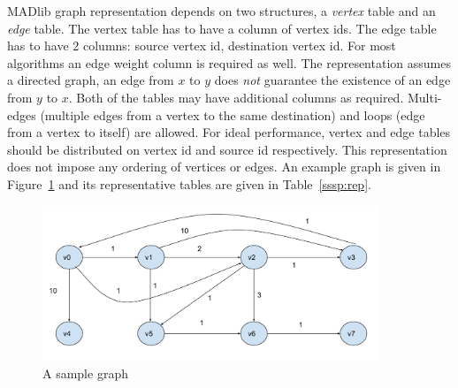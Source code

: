 MADlib graph representation depends on two structures, a \emph{vertex} table and an \emph{edge} table. The vertex table has to have a column of vertex ids. The edge table has to have 2 columns: source vertex id, destination vertex id. For most algorithms an edge weight column is required as well. The representation assumes a directed graph, an edge from $x$ to $y$ does \emph{not} guarantee the existence of an edge from $y$ to $x$. Both of the tables may have additional columns as required. Multi-edges (multiple edges from a vertex to the same destination) and loops (edge from a vertex to itself) are allowed. For ideal performance, vertex and edge tables should be distributed on vertex id and source id respectively. This representation does not impose any ordering of vertices or edges. An example graph is given in Figure~\ref{sssp:example} and its representative tables are given in Table~\ref{sssp:rep}.

\begin{figure}[h]
	\centering
	\includegraphics[width=0.9\textwidth]{figures/graph_example.pdf}
\caption{A sample graph}
\label{sssp:example}
\end{figure}

